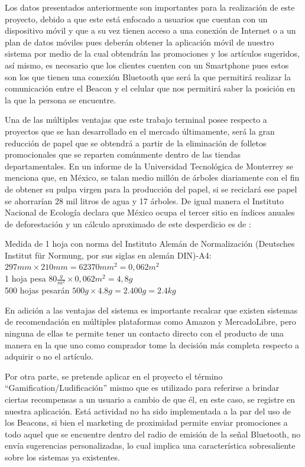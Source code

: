Los datos presentados anteriormente son importantes para la realización de este proyecto, debido a que este está enfocado a usuarios que cuentan con un dispositivo móvil y que a su vez tienen acceso a una conexión de Internet o a un plan de datos móviles pues deberán obtener la aplicación móvil de nuestro sistema por medio de la cual obtendrán las promociones y los artículos sugeridos, así mismo, es necesario que los clientes cuenten con un Smartphone pues estos son los que tienen una conexión Bluetooth que será la que permitirá realizar la comunicación entre el Beacon y el celular que nos permitirá saber la posición en la que la persona se encuentre.
\\ \par
Una de las múltiples ventajas que este trabajo terminal posee respecto a proyectos que se han desarrollado en el mercado últimamente, será la gran reducción de papel que se obtendrá a partir de la eliminación de folletos promocionales que se reparten comúnmente dentro de las tiendas departamentales. En un informe de la Universidad Tecnológica de Monterrey se menciona que, en México, se talan medio millón de árboles diariamente con el fin de obtener su pulpa virgen para la producción del papel, si se reciclará ese papel se ahorrarían 28 mil litros de agua y 17 árboles. De igual manera el Instituto Nacional de Ecología declara que México ocupa el tercer sitio en índices anuales de deforestación y un cálculo aproximado de este desperdicio es de  \cite{TecMty}:
\\ \par
Medida de 1 hoja con norma del Instituto Alemán de Normalización (Deutsches Institut für Normung, por sus siglas en alemán DIN)-A4: $297 mm \times 210 mm = 62370 mm^2 = 0,062 m^2$ 
\\
1 hoja pesa $80\frac{g}{m^2} \times 0,062m^2 = 4,8 g$\\
500 hojas pesarán $500 g \times 4.8 g = 2.400 g = 2.4 kg$
\\ \par
En adición a las ventajas del sistema es importante recalcar que existen sistemas de recomendación en múltiples plataformas como Amazon y MercadoLibre, pero ninguna de ellas te permite tener un contacto directo con el producto de una manera en la que uno como comprador tome la decisión más completa respecto a adquirir o no el artículo.
\\ \par
Por otra parte, se pretende aplicar en el proyecto el término “Gamification/Ludificación” mismo que es utilizado para referirse a brindar ciertas recompensas a un usuario a cambio de que él, en este caso, se registre en nuestra aplicación. Está actividad no ha sido implementada a la par del uso de los Beacons, si bien el marketing de proximidad permite enviar promociones a todo aquel que se encuentre dentro del radio de emisión de la señal Bluetooth, no envía sugerencias personalizadas, lo cual implica una característica sobresaliente sobre los sistemas ya existentes.
